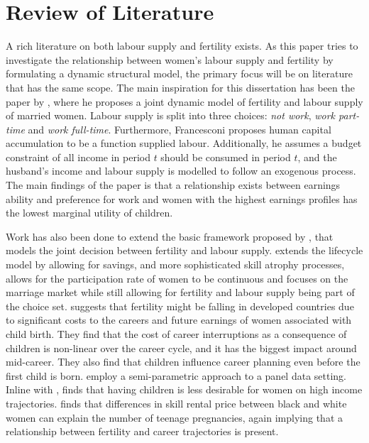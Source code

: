 \section{Review of Literature}\label{sec:lit_review}

A rich literature on both labour supply and fertility exists. As this paper tries to investigate the relationship between women's labour supply and fertility by formulating a dynamic  structural model, the primary focus will be on literature that has the same scope. The main inspiration for this dissertation has been the paper by \textcite{francesconi_joint_2002}, where he proposes a joint dynamic model of fertility and labour supply of married women. Labour supply is split into three choices: \textit{not work}, \textit{work part-time} and \textit{work full-time}. Furthermore, Francesconi proposes human capital accumulation to be a function supplied labour. Additionally, he assumes a budget constraint of all income in period $t$ should be consumed in period $t$, and the husband's income and labour supply is modelled to follow an exogenous process. The main findings of the paper is that a relationship exists between earnings ability and preference for work and women with the highest earnings profiles has the lowest marginal utility of children.

Work has also been done to extend the basic framework proposed by \textcite{francesconi_joint_2002}, that models the joint decision between fertility and labour supply.  \textcite{adda_career_2011} extends the lifecycle model by allowing for savings, and more sophisticated skill atrophy processes, \textcite{gayle_life-cyle_2006} allows for the participation rate of women to be continuous and \textcite{keane_role_2010} focuses on the marriage market while still allowing for fertility and labour supply being part of the choice set. \textcite{adda_career_2011} suggests that fertility might be falling in developed countries due to significant costs to the careers and future earnings of women associated with child birth. They find that the cost of career interruptions as a consequence of children is non-linear over the career cycle, and it has the biggest impact around mid-career. They also find that children influence career planning even before the first child is born. \textcite{gayle_life-cyle_2006} employ a semi-parametric approach to a panel data setting. Inline with \textcite{francesconi_joint_2002}, \textcite{gayle_life-cyle_2006} finds that having children is less desirable for women on high income trajectories. \textcite{keane_role_2010} finds that differences in skill rental price between black and white women can explain the number of teenage pregnancies, again implying that a relationship between fertility and career trajectories is present.

